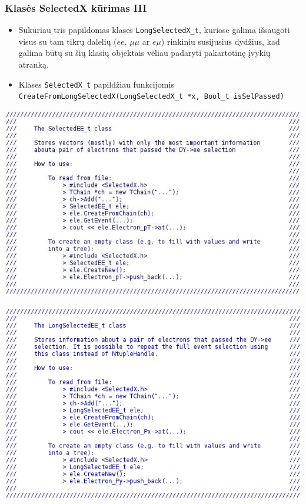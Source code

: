 \documentclass{beamer}
\newcommand{\emu}{\mathit{e}\mu}
\newcommand{\ee}{\mathit{ee}}
\newcommand{\mumu}{\mu\mu}
\begin{document}
\begin{frame}
\frametitle{Klasės SelectedX kūrimas III}

\begin{itemize}
	\item Sukūriau tris papildomas klases \texttt{LongSelectedX\_t}, kuriose galima išsaugoti visus su tam tikrų dalelių ($\ee$, $\mumu$ ar $\emu$) rinkiniu susijusius dydžius, kad galima būtų su šių klasių objektais vėliau padaryti pakartotinę įvykių atranką.
	\item Klases \texttt{SelectedX\_t} papildžiau funkcijomis \texttt{CreateFromLongSelectedX(LongSelectedX\_t *x, Bool\_t isSelPassed)}
\end{itemize}
\begin{minipage}{0.49\textwidth}
\includegraphics[width=\textwidth]{Selected.JPG}
\end{minipage}
\hfill
\begin{minipage}{0.49\textwidth}
\includegraphics[width=\textwidth]{LongSelected.png}
\end{minipage}


\end{frame}
\end{document}
